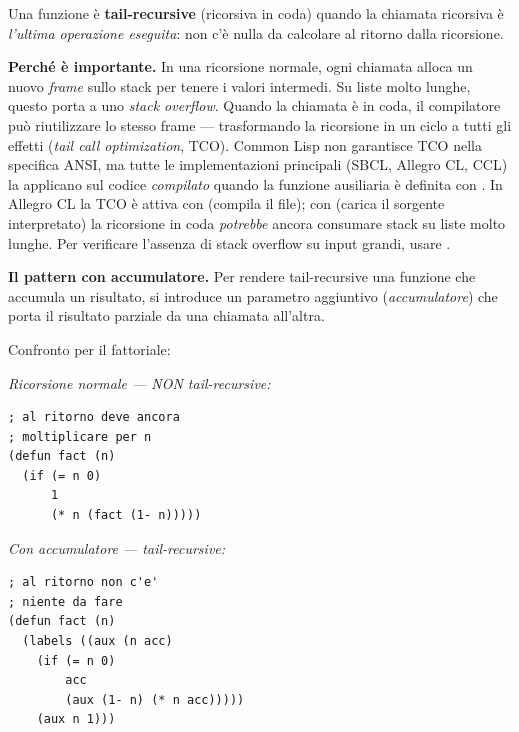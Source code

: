 \bigskip
\label{nota:tailrec}
\begin{tcolorbox}[
  enhanced,
  colframe=black!35,
  colback=black!3,
  fonttitle=\bfseries\small,
  title={Nota tecnica: Tail recursion (ricorsione in coda)},
  arc=3pt,
  boxrule=0.6pt,
  left=12pt, right=12pt, top=8pt, bottom=8pt,
  toptitle=3pt, bottomtitle=3pt,
  before skip=18pt plus 4pt,
  after skip=12pt plus 3pt,
  parskip=5pt
]
\small\color{black!75}

Una funzione è \textbf{tail-recursive} (ricorsiva in coda) quando la
chiamata ricorsiva è \textit{l'ultima operazione eseguita}: non c'è
nulla da calcolare al ritorno dalla ricorsione.

\medskip
\textbf{Perché è importante.}
In una ricorsione normale, ogni chiamata alloca un nuovo \textit{frame}
sullo stack per tenere i valori intermedi. Su liste molto lunghe, questo
porta a uno \textit{stack overflow}. Quando la chiamata è in coda, il
compilatore può riutilizzare lo stesso frame — trasformando la ricorsione
in un ciclo a tutti gli effetti (\textit{tail call optimization}, TCO).
Common Lisp non garantisce TCO nella specifica ANSI, ma tutte le
implementazioni principali (SBCL, Allegro CL, CCL) la applicano
sul codice \textit{compilato} quando la funzione ausiliaria è definita
con . In Allegro CL la TCO è attiva con  (compila
il file); con  (carica il sorgente interpretato) la ricorsione
in coda \textit{potrebbe} ancora consumare stack su liste molto lunghe.
Per verificare l'assenza di stack overflow su input grandi, usare .

\medskip
\textbf{Il pattern con accumulatore.}
Per rendere tail-recursive una funzione che accumula un risultato, si
introduce un parametro aggiuntivo (\textit{accumulatore}) che porta
il risultato parziale da una chiamata all'altra.

\medskip
Confronto per il fattoriale:

\begin{minipage}[t]{0.45\textwidth}
\textcolor{black!55}{\textit{Ricorsione normale — NON tail-recursive:}}
\begin{lstlisting}
; al ritorno deve ancora
; moltiplicare per n
(defun fact (n)
  (if (= n 0)
      1
      (* n (fact (1- n)))))
\end{lstlisting}
\end{minipage}
\hfill
\begin{minipage}[t]{0.50\textwidth}
\textcolor{black!55}{\textit{Con accumulatore — tail-recursive:}}
\begin{lstlisting}
; al ritorno non c'e'
; niente da fare
(defun fact (n)
  (labels ((aux (n acc)
    (if (= n 0)
        acc
        (aux (1- n) (* n acc)))))
    (aux n 1)))
\end{lstlisting}
\end{minipage}


\end{tcolorbox}
